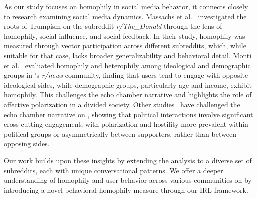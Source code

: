As our study focuses on homophily in social media behavior, it connects closely to research examining social media dynamics. Massachs et al.~\cite{massachs2020roots} investigated the roots of Trumpism on the subreddit \textit{r/The\_Donald} through the lens of homophily, social influence, and social feedback. In their study, homophily was measured through vector participation across different subreddits, which, while suitable for that case, lacks broader generalizability and behavioral detail. 
Monti et al.~\cite{monti2023evidence} evaluated homophily and heterophily among ideological and demographic groups in \reddit's \textit{r/news} community, finding that users tend to engage with opposite ideological sides, while demographic groups, particularly age and income, exhibit homophily. This challenges the echo chamber narrative and highlights the role of affective polarization in a divided society. Other studies~\cite{de2021no,efstratiou2023non} have challenged the echo chamber narrative on \reddit, showing that political interactions involve significant cross-cutting engagement, with polarization and hostility more prevalent within political groups or asymmetrically between supporters, rather than between opposing sides.

Our work builds upon these insights by extending the analysis to a diverse set of subreddits, each with unique conversational patterns. We offer a deeper understanding of homophily and user behavior across various communities on \reddit by introducing a novel behavioral homophily measure through our IRL framework. %